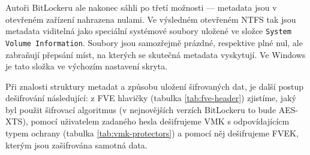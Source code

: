 Autoři BitLockeru ale nakonec sáhli po třetí možnosti --- metadata jsou v otevřeném zařízení nahrazena nulami. Ve výsledném otevřeném NTFS tak jsou metadata viditelná jako speciální systémové soubory uložené ve složce \texttt{System Volume Information}. Sou\-bo\-ry jsou samozřejmě prázdné, respektive plné nul, ale zabraňují přepsání míst, na kterých se skutečná metadata vyskytují. Ve Windows je tato složka ve výchozím nastavení skryta.


Při znalosti struktury metadat a způsobu uložení šifrovaných dat, je další postup dešifrování následující: z FVE hlavičky (tabulka \ref{tab:fve-header}) zjistíme, jaký byl použit šifrovací algoritmus (v nejnovějších verzích BitLockeru to bude AES-XTS), pomocí uživatelem zadaného hesla dešifrujeme VMK s odpovídajícícm typem ochrany (tabulka \ref{tab:vmk-protectors}) a pomocí něj dešifrujeme FVEK, kterým jsou zašifrována samotná data.

